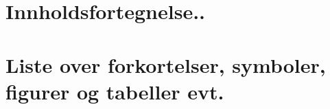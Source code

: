 \documentclass[12pt, norsk]{article}
\begin{document}



\newpage


\newpage


\section*{Innholdsfortegnelse..}
\section*{Liste over forkortelser, symboler, figurer og tabeller evt.}
\newpage

\setcounter{page}{1}




\newpage




\newpage




\newpage


\newpage


\newpage


\newpage



\printbibliography
\newpage

\setcounter{page}{1}
\appendix



\end{document}
